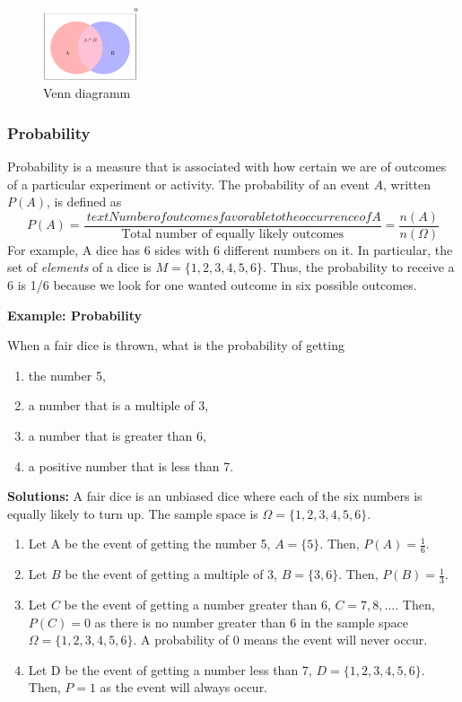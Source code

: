 \documentclass[
  12pt,
  oneside]{book}
\providecommand{\tightlist}{%
  \setlength{\itemsep}{0pt}\setlength{\parskip}{0pt}}
\theoremstyle{definition}
\theoremstyle{definition}
\theoremstyle{definition}
\theoremstyle{definition}
\theoremstyle{remark}
\begin{document}
\begin{figure}
\centering
\includegraphics[width=0.25\textwidth,height=\textheight]{fig/venndia.png}
\caption{\label{fig:venndiagramm} Venn diagramm}
\end{figure}

\hypertarget{probability}{%
\subsubsection{Probability}\label{probability}}

Probability is a measure that is associated with how certain we are of outcomes of a particular experiment or activity. The probability of an event \(A\), written \(P(A)\), is defined as
\[
P(A)=\frac{\
text{Number of outcomes favorable to the occurrence of } A}{\text{Total number of equally likely outcomes}}=\frac{n(A)}{n(\Omega)}
\]
For example, A dice has 6 sides with 6 different numbers on it. In particular, the set of \emph{elements} of a dice is \(M=\{1,2,3,4,5,6\}\). Thus, the probability to receive a 6 is 1/6 because we look for one wanted outcome in six possible outcomes.

\textbf{Example: Probability}

When a fair dice is thrown, what is the probability of getting

\begin{enumerate}
\def\labelenumi{\alph{enumi})}
\tightlist
\item
  the number 5,
\item
  a number that is a multiple of 3,
\item
  a number that is greater than 6,
\item
  a positive number that is less than 7.
\end{enumerate}

\textbf{Solutions:} A fair dice is an unbiased dice where each of the six numbers is equally likely to turn up. The sample space is \(\Omega = \{1, 2, 3, 4, 5, 6\}\).

\begin{enumerate}
\def\labelenumi{\alph{enumi})}
\tightlist
\item
  Let A be the event of getting the number 5, \(A=\{5\}\). Then, \(P(A)=\frac{1}{6}\).
\item
  Let \(B\) be the event of getting a multiple of 3, \(B=\{3, 6\}\). Then, \(P(B)=\frac{1}{3}\).
\item
  Let \(C\) be the event of getting a number greater than 6, \(C=7,8,\dots\). Then, \(P(C)=0\) as there is no number greater than 6 in the sample space \(\Omega=\{1,2,3,4,5,6\}\). A probability of 0 means the event will never occur.
\item
  Let D be the event of getting a number less than 7, \(D=\{1,2,3,4,5,6\}\). Then, \(P=1\) as the event will always occur.
\end{enumerate}
\end{document}

